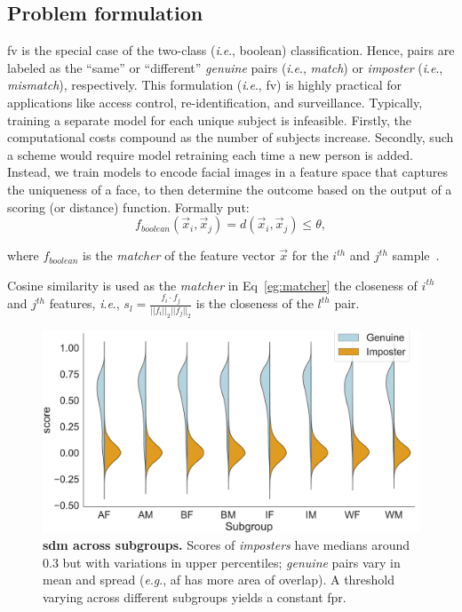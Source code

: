 \documentclass[10pt,twocolumn,letterpaper]{article}
\newcommand{\ie}{\textit{i}.\textit{e}., }
\newcommand{\eg}{\textit{e}.\textit{g}., }
\begin{document}
\subsection{Problem formulation}\label{subsec:pf} 
\Gls{fv} is the special case of the two-class (\ie boolean) classification. Hence, pairs are labeled as the ``same'' or ``different'' \textit{genuine} pairs (\ie \textit{match}) or \textit{imposter} (\ie \textit{mismatch}), respectively. This formulation (\ie \gls{fv}) is highly practical for applications like access control, re-identification, and surveillance. Typically, training a separate model for each unique subject is infeasible. Firstly, the computational costs compound as the number of subjects increase.  Secondly, such a scheme would require model retraining each time a new person is added. Instead, we train models to encode facial images in a feature space that captures the uniqueness of a face, to then determine the outcome based on the output of a scoring (or distance) function. Formally put:
\begin{equation}\label{eg:matcher}
    f_{boolean}(\vec{x}_i, \vec{x}_j) = d(\vec{x}_i, \vec{x}_j) \leq \theta,
\end{equation}

where $f_{boolean}$ is the \textit{matcher} of the feature vector $\vec{x}$ for the $i^{th}$ and $j^{th}$ sample~\cite{LFWTech}.

Cosine similarity is used as the \emph{matcher} in Eq~\ref{eg:matcher} the closeness of $i^{th}$ and $j^{th}$ features, \ie
$
s_l= \frac{f_i\cdot f_j}{||f_i||_2||f_j||_2}
$ is the closeness of the $l^{th}$ pair. 

\begin{figure}[t!] 
	\centering
	\centering
	\includegraphics[width=1\linewidth]{figures/violinplots.pdf}
		\caption{\small{\textbf{\Gls{sdm} across subgroups.} Scores of \emph{imposters} have medians around 0.3 but with variations in upper percentiles; \emph{genuine} pairs vary in mean and spread (\eg \gls{af} has more area of overlap). A threshold varying across different subgroups yields a constant \gls{fpr}.}} \label{fig:detection-model} 
\end{figure} 
\end{document}
